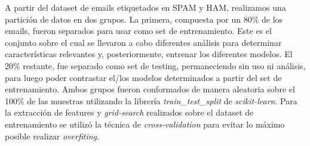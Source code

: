 A partir del dataset de emails etiquetados en SPAM y HAM, realizamos una partición de datos en dos grupos. La primera, compuesta por un 80\% de los emails, fueron separados para usar como set de entrenamiento. Este es el conjunto sobre el cual se llevaron a cabo diferentes análisis para determinar características relevantes y, posteriormente, entrenar los diferentes modelos. El 20\% restante, fue separado como set de testing, permaneciendo sin uso ni análisis, para luego poder contrastar el/los modelos determinados a partir del set de entrenamiento. Ambos grupos fueron conformados de manera aleatoria sobre el 100\% de las muestras utilizando la librería \textit{train\_test\_split} de \textit{scikit-learn}. Para la extracción de features y \textit{grid-search} realizados sobre el dataset de entrenamiento se utilizó la técnica de \textit{cross-validation} para evitar lo máximo posible realizar \textit{overfiting}.